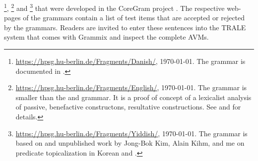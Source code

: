 \footnote{
\url{https://hpsg.hu-berlin.de/Fragments/Danish/}, \today. The  grammar is documented in
. 
}, \footnote{
\url{https://hpsg.hu-berlin.de/Fragments/English/}, \today. The  grammar is smaller than the
 and  grammar. It is a proof of concept of a lexicalist analysis of passive, benefactive
constructons, resultative constructions. See  and  for details.
} and \footnote{
\url{https://hpsg.hu-berlin.de/Fragments/Yiddish/}, \today. The  grammar is based on
 and unpublished work by Jong-Bok Kim, Alain Kihm, and me on predicate
topicalization in Korean and  \citep*{MKK2019a}.
} that were developed in the CoreGram project \citep{MuellerCoreGram}. The respective web-pages of the grammars contain a list of test items
that are accepted or rejected by the grammars. Readers are invited to enter these
sentences into the TRALE system \citep{DKMM2004a-u,Penn2004a-u} that comes with Grammix and inspect the complete AVMs.

